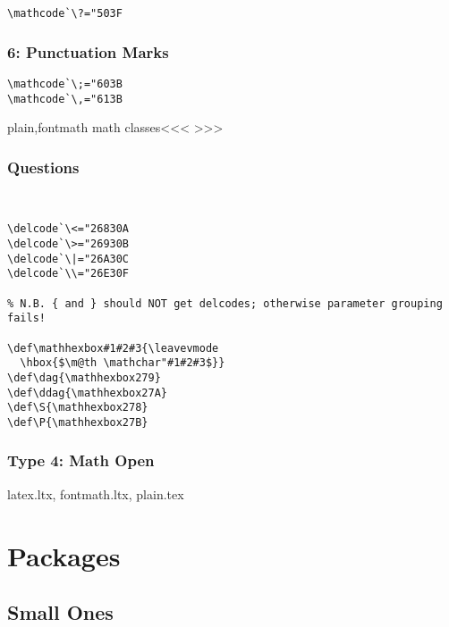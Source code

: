 {{{{{{\begin{verbatim}
\mathcode`\?="503F
\end{verbatim}

\subsection{6: Punctuation Marks}

\begin{verbatim}
\mathcode`\;="603B
\mathcode`\,="613B
\end{verbatim}

\<plain,fontmath math classes\><<<
>>>

\subsection{Questions}

\begin{verbatim}


\delcode`\<="26830A
\delcode`\>="26930B
\delcode`\|="26A30C
\delcode`\\="26E30F

% N.B. { and } should NOT get delcodes; otherwise parameter grouping fails!

\def\mathhexbox#1#2#3{\leavevmode
  \hbox{$\m@th \mathchar"#1#2#3$}}
\def\dag{\mathhexbox279}
\def\ddag{\mathhexbox27A}
\def\S{\mathhexbox278}
\def\P{\mathhexbox27B}
\end{verbatim}

\subsection{Type 4: Math Open}


latex.ltx, fontmath.ltx, plain.tex



\chapter{Packages}

\section{Small Ones}



}}}}}}
